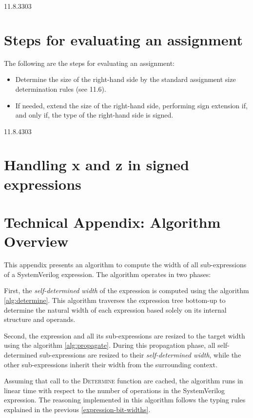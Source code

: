 \documentclass{article}
\newcommand{\sds}{\emph{self-determined width}}
\begin{document}
\begin{lrmquote}{11.8.3}{303}
  {
    \color{red}

    \section{Steps for evaluating an assignment}

    The following are the steps for evaluating an assignment:
    \begin{itemize}
      \item Determine the size of the right-hand side by the standard assignment
        size determination rules (see 11.6).
      \item If needed, extend the size of the right-hand side, performing sign
        extension if, and only if, the type of the right-hand side is signed.
    \end{itemize}
  }
\end{lrmquote}
\begin{lrmquote}{11.8.4}{303}
  \section{Handling x and z in signed expressions}

  \textelp{}
\end{lrmquote}


\appendix
\section{Technical Appendix: Algorithm Overview}
\label{algorithm-overview}

This appendix presents an algorithm to compute the width of all sub-expressions
of a SystemVerilog expression. The algorithm operates in two phases:

First, the \sds{} of the expression is computed using the algorithm
\ref{alg:determine}. This algorithm traverses the expression
tree bottom-up to determine the natural width of each expression based solely on
its internal structure and operands.

Second, the expression and all its sub-expressions are resized to the target
width using the algorithm \ref{alg:propagate}. During this
propagation phase, all self-determined sub-expressions are resized to their
\sds{}, while the other sub-expressions inherit their width from the surrounding
context.

Assuming that call to the \textsc{Determine} function are cached, the algorithm
runs in linear time with respect to the number of operations in
the SystemVerilog expression. The reasoning implemented in this algorithm
follows the typing rules explained in the previous
\autoref{expression-bit-widths}.
\end{document}
